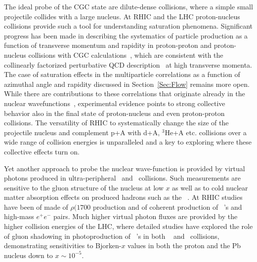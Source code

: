 The ideal probe of the CGC state are dilute-dense collisions, where a simple small
projectile collides with a large nucleus. At RHIC and the LHC proton-nucleus 
collisions provide such a tool for understanding saturation phenomena. 
Significant progress has been made in describing
the systematics of particle production as a function of transverse momentum and rapidity
in proton-proton and proton-nucleus collisions with CGC 
calculations~\cite{Albacete:2012xq,Tribedy:2011aa,Lappi:2013zma,Fujii:2013gxa,Kang:2013hta}, which are consistent with  the 
collinearly factorized perturbative QCD description~\cite{Helenius:2012wd} at high transverse momenta. 
The case of saturation effects in the multiparticle correlations as a function of azimuthal
angle and rapidity discussed in Section~\ref{Sec:Flow} remains more open. While there are contributions to these correlations 
that originate already in the nuclear wavefunctions~\cite{Dusling:2013oia}, experimental 
evidence points to strong collective behavior also in the final state of 
proton-nucleus and even proton-proton collisions. 
The versatility
of RHIC to systematically change the size of the projectile nucleus
and complement p+A with d+A, $^3$He+A etc. collisions over a wide
range of collision energies is unparalleled and a key to exploring
where these collective effects turn on.  

Yet another approach to probe the nuclear wave-function is provided by virtual photons
produced in ultra-peripheral \pA\ and \AplusA\ collisions. 
Such measurements are sensitive to the gluon structure of the nucleus at low $x$
as well as to cold nuclear matter absorption effects on produced hadrons such as the \Jpsi\ .
At RHIC studies have been of made of $\rho(1700$ production\cite{Abelev:2009aa}
and of coherent production of \JPsi\ 's and high-mass $e^+e^-$ pairs\cite{Afanasiev:2009hy}.
Much higher virtual photon fluxes are provided by the higher collision energies of the LHC, where detailed 
studies have explored the role of gluon shadowing 
in photoproduction of \JPsi\ 's in both \pPb\ \cite{TheALICE:2014dwa} and \PbPb\ collisions\cite{Abelev:2012ba,Abbas:2013oua,CMS:2014ies},
demonstrating sensitivities to Bjorken-$x$ values in both the proton and the Pb nucleus down to $x \sim 10^{-5}$.

 
 

